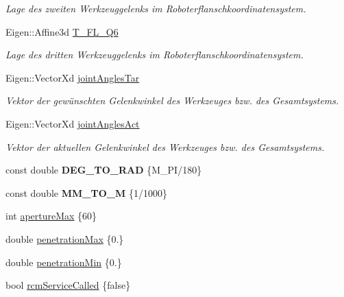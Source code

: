 \begin{DoxyCompactItemize}
\begin{DoxyCompactList}\small\item\em Lage des zweiten Werkzeuggelenks im Roboterflanschkoordinatensystem. \end{DoxyCompactList}\item 
\hypertarget{classIKinematic_a47670e07b24a57aabea5bbbb809eac03}{Eigen\-::\-Affine3d \hyperlink{classIKinematic_a47670e07b24a57aabea5bbbb809eac03}{T\-\_\-\-F\-L\-\_\-\-Q6}}\label{classIKinematic_a47670e07b24a57aabea5bbbb809eac03}

\begin{DoxyCompactList}\small\item\em Lage des dritten Werkzeuggelenks im Roboterflanschkoordinatensystem. \end{DoxyCompactList}\item 
\hypertarget{classIKinematic_aaac2e6408544098357a85b2b86ab25c3}{Eigen\-::\-Vector\-Xd \hyperlink{classIKinematic_aaac2e6408544098357a85b2b86ab25c3}{joint\-Angles\-Tar}}\label{classIKinematic_aaac2e6408544098357a85b2b86ab25c3}

\begin{DoxyCompactList}\small\item\em Vektor der gewünschten Gelenkwinkel des Werkzeuges bzw. des Gesamtsystems. \end{DoxyCompactList}\item 
\hypertarget{classIKinematic_ac262b75f38e66b1829585d398082fa10}{Eigen\-::\-Vector\-Xd \hyperlink{classIKinematic_ac262b75f38e66b1829585d398082fa10}{joint\-Angles\-Act}}\label{classIKinematic_ac262b75f38e66b1829585d398082fa10}

\begin{DoxyCompactList}\small\item\em Vektor der aktuellen Gelenkwinkel des Werkzeuges bzw. des Gesamtsystems. \end{DoxyCompactList}\item 
\hypertarget{classIKinematic_a37f44565aecbf830fa9c19b4fab672b2}{const double {\bfseries D\-E\-G\-\_\-\-T\-O\-\_\-\-R\-A\-D} \{M\-\_\-\-P\-I/180\}}\label{classIKinematic_a37f44565aecbf830fa9c19b4fab672b2}

\item 
\hypertarget{classIKinematic_ac41e50cd51191976b720a8ddd789188e}{const double {\bfseries M\-M\-\_\-\-T\-O\-\_\-\-M} \{1/1000\}}\label{classIKinematic_ac41e50cd51191976b720a8ddd789188e}

\item 
int \hyperlink{classIKinematic_a5b70ed8f56334c0ee5041e5eb787a056}{aperture\-Max} \{60\}
\item 
double \hyperlink{classIKinematic_a628b36a0331179b979468468c1efed54}{penetration\-Max} \{0.\}
\item 
double \hyperlink{classIKinematic_a17905911cc852a855bd985bfda640ea2}{penetration\-Min} \{0.\}
\item 
\hypertarget{classIKinematic_ad784d5dcc50b918c3b447e35b33d10e4}{bool \hyperlink{classIKinematic_ad784d5dcc50b918c3b447e35b33d10e4}{rcm\-Service\-Called} \{false\}}\label{classIKinematic_ad784d5dcc50b918c3b447e35b33d10e4}


\end{DoxyCompactItemize}
